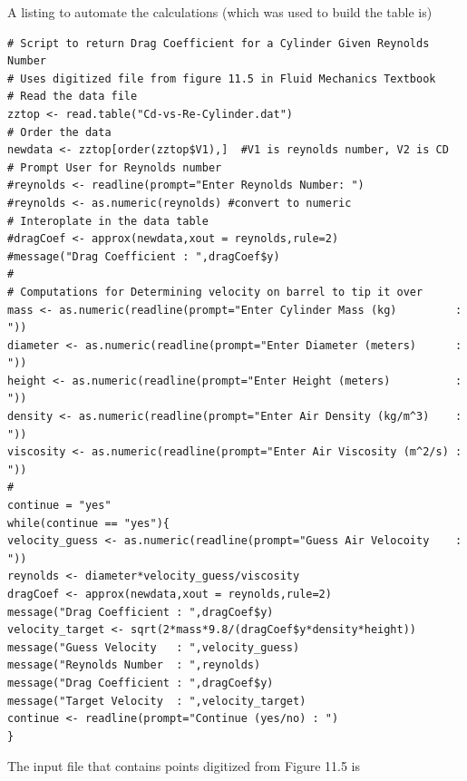 \documentclass[12pt]{article}
\begin{document}
A listing to automate the calculations (which was used to build the table is)
\begin{verbatim}
# Script to return Drag Coefficient for a Cylinder Given Reynolds Number
# Uses digitized file from figure 11.5 in Fluid Mechanics Textbook
# Read the data file
zztop <- read.table("Cd-vs-Re-Cylinder.dat")
# Order the data
newdata <- zztop[order(zztop$V1),]  #V1 is reynolds number, V2 is CD
# Prompt User for Reynolds number
#reynolds <- readline(prompt="Enter Reynolds Number: ")
#reynolds <- as.numeric(reynolds) #convert to numeric
# Interoplate in the data table
#dragCoef <- approx(newdata,xout = reynolds,rule=2)
#message("Drag Coefficient : ",dragCoef$y)
#
# Computations for Determining velocity on barrel to tip it over
mass <- as.numeric(readline(prompt="Enter Cylinder Mass (kg)         : "))
diameter <- as.numeric(readline(prompt="Enter Diameter (meters)      : "))
height <- as.numeric(readline(prompt="Enter Height (meters)          : "))
density <- as.numeric(readline(prompt="Enter Air Density (kg/m^3)    : "))
viscosity <- as.numeric(readline(prompt="Enter Air Viscosity (m^2/s) : "))
#
continue = "yes"
while(continue == "yes"){
velocity_guess <- as.numeric(readline(prompt="Guess Air Velocoity    : "))
reynolds <- diameter*velocity_guess/viscosity
dragCoef <- approx(newdata,xout = reynolds,rule=2)
message("Drag Coefficient : ",dragCoef$y)
velocity_target <- sqrt(2*mass*9.8/(dragCoef$y*density*height))
message("Guess Velocity   : ",velocity_guess)
message("Reynolds Number  : ",reynolds)
message("Drag Coefficient : ",dragCoef$y)
message("Target Velocity  : ",velocity_target)
continue <- readline(prompt="Continue (yes/no) : ")
}
\end{verbatim}
The input file that contains points digitized from Figure 11.5 is
\end{document}
